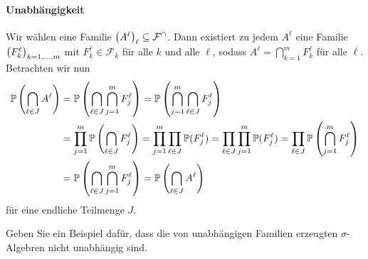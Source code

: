 \begin{exercisePage}
	\paragraph{Unabhängigkeit}
	Wir wählen eine Familie $\folge{A^\ell}[\ell] \subseteq \mathcal{F}^\cap$. Dann existiert zu jedem $A^\ell$ eine Familie $\folge{F_k^\ell}[k = 1, \dots , m]$ mit $F_k^\ell \in \mathcal{F}_k$ für alle $k$ und alle $\ell$, sodass $A^\ell = \bigcap_{k =1}^m F_k^\ell$ für alle $\ell$. Betrachten wir nun
	\begin{equation*}
	\begin{aligned}
		\P \left( \bigcap_{\ell \in J} A^\ell \right)
		&= \P \left( \bigcap_{\ell \in J} \bigcap_{j=1}^m F_j^\ell \right)
		= \P \left( \bigcap_{j=1}^m \bigcap_{\ell \in J} F_j^\ell \right) \\
		&= \prod_{j=1}^m \P \left( \bigcap_{\ell \in J} F_j^\ell \right) 
		= \prod_{j=1}^m \prod_{\ell \in J} \P(F_j^\ell)
		= \prod_{\ell \in J} \prod_{j=1}^m \P(F_j^\ell)
		= \prod_{\ell \in J} \P \left( \bigcap_{j=1}^m F_j^\ell \right) \\
		&= \P \left( \bigcap_{\ell \in J} \bigcap_{j=1}^m F_j^\ell \right)
		= \P \left( \bigcap_{\ell \in J} A^\ell \right)
	\end{aligned}
	\end{equation*}
	für eine endliche Teilmenge $J$.
	
	\begin{homework}[$\star$]
		Geben Sie ein Beispiel dafür, dass die von unabhängigen Familien erzeugten $\sigma$-Algebren nicht unabhängig sind.
	\end{homework}


\end{exercisePage}
